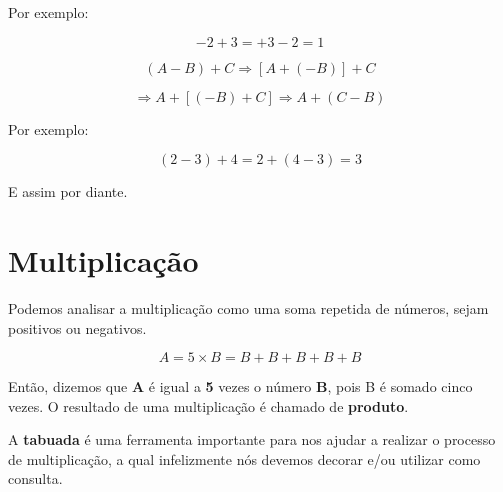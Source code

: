 Por exemplo:

\begin{equation}
    -2+3=+3-2=1
\end{equation}

\begin{tcolorbox}[title = Associativa]
    \begin{equation}
        (A - B) + C \Rightarrow [ A + (-B) ] + C 
    \end{equation}

    \begin{equation}
        \Rightarrow A + [ (-B) + C ] \Rightarrow A + (C - B)
    \end{equation}
\end{tcolorbox}

Por exemplo:

\begin{equation}
    (2-3)+4=2+(4-3)=3
\end{equation}

E assim por diante. 

\newpage
\section{Multiplicação}

Podemos analisar a multiplicação como uma soma repetida de números, sejam positivos ou negativos.

\begin{equation}
    A = 5 \times B=B+B+B+B+B
\end{equation}

Então, dizemos que \textbf{A} é igual a \textbf{5} vezes o número \textbf{B}, pois B é somado cinco vezes. O resultado de uma multiplicação é chamado de \textbf{produto}.

A \textbf{tabuada} é uma ferramenta importante para nos ajudar a realizar o processo de multiplicação, a qual infelizmente nós devemos decorar e/ou utilizar como consulta.

    
